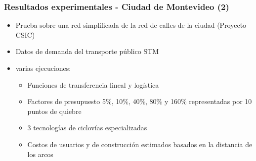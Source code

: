 \documentclass[aspectratio=43, 10pt]{beamer}
\begin{document}
\begin{frame}
    \frametitle{Resultados experimentales - Ciudad de Montevideo (2)}

    \begin{itemize}
        \item{Prueba sobre una red simplificada de la red de calles de la ciudad (Proyecto CSIC)}
        \item{Datos de demanda del transporte público STM
            \parencite{Massobrio2020}}
        \item{varias ejecuciones:
            \begin{itemize}
                \item{Funciones de transferencia lineal y logística}
                \item{Factores de presupuesto 5\%, 10\%, 40\%, 80\% y 160\% representadas por 10 puntos de quiebre}
                \item{3 tecnologías de ciclovías especializadas}
                \item{Costos de usuarios y de construcción estimados basados en la distancia de los arcos}
            \end{itemize}
        }
    \end{itemize}
\end{frame}
\end{document}
